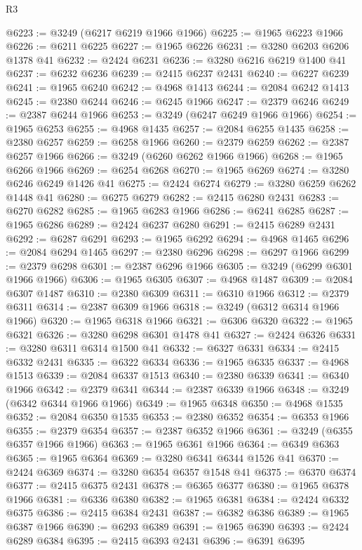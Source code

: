 \begin{lexlean}{R3}
\begin{coremodule}
@6223 := @3249 (@6217 @6219 @1966 @1966)
@6225 := @1965 @6223 @1966
@6226 := @6211 @6225
@6227 := @1965 @6226
@6231 := @3280 @6203 @6206 @1378 @41
@6232 := @2424 @6231
@6236 := @3280 @6216 @6219 @1400 @41
@6237 := @6232 @6236
@6239 := @2415 @6237 @2431
@6240 := @6227 @6239
@6241 := @1965 @6240
@6242 := @4968 @1413
@6244 := @2084 @6242 @1413
@6245 := @2380 @6244
@6246 := @6245 @1966
@6247 := @2379 @6246
@6249 := @2387 @6244 @1966
@6253 := @3249 (@6247 @6249 @1966 @1966)
@6254 := @1965 @6253
@6255 := @4968 @1435
@6257 := @2084 @6255 @1435
@6258 := @2380 @6257
@6259 := @6258 @1966
@6260 := @2379 @6259
@6262 := @2387 @6257 @1966
@6266 := @3249 (@6260 @6262 @1966 @1966)
@6268 := @1965 @6266 @1966
@6269 := @6254 @6268
@6270 := @1965 @6269
@6274 := @3280 @6246 @6249 @1426 @41
@6275 := @2424 @6274
@6279 := @3280 @6259 @6262 @1448 @41
@6280 := @6275 @6279
@6282 := @2415 @6280 @2431
@6283 := @6270 @6282
@6285 := @1965 @6283 @1966
@6286 := @6241 @6285
@6287 := @1965 @6286
@6289 := @2424 @6237 @6280
@6291 := @2415 @6289 @2431
@6292 := @6287 @6291
@6293 := @1965 @6292
@6294 := @4968 @1465
@6296 := @2084 @6294 @1465
@6297 := @2380 @6296
@6298 := @6297 @1966
@6299 := @2379 @6298
@6301 := @2387 @6296 @1966
@6305 := @3249 (@6299 @6301 @1966 @1966)
@6306 := @1965 @6305
@6307 := @4968 @1487
@6309 := @2084 @6307 @1487
@6310 := @2380 @6309
@6311 := @6310 @1966
@6312 := @2379 @6311
@6314 := @2387 @6309 @1966
@6318 := @3249 (@6312 @6314 @1966 @1966)
@6320 := @1965 @6318 @1966
@6321 := @6306 @6320
@6322 := @1965 @6321
@6326 := @3280 @6298 @6301 @1478 @41
@6327 := @2424 @6326
@6331 := @3280 @6311 @6314 @1500 @41
@6332 := @6327 @6331
@6334 := @2415 @6332 @2431
@6335 := @6322 @6334
@6336 := @1965 @6335
@6337 := @4968 @1513
@6339 := @2084 @6337 @1513
@6340 := @2380 @6339
@6341 := @6340 @1966
@6342 := @2379 @6341
@6344 := @2387 @6339 @1966
@6348 := @3249 (@6342 @6344 @1966 @1966)
@6349 := @1965 @6348
@6350 := @4968 @1535
@6352 := @2084 @6350 @1535
@6353 := @2380 @6352
@6354 := @6353 @1966
@6355 := @2379 @6354
@6357 := @2387 @6352 @1966
@6361 := @3249 (@6355 @6357 @1966 @1966)
@6363 := @1965 @6361 @1966
@6364 := @6349 @6363
@6365 := @1965 @6364
@6369 := @3280 @6341 @6344 @1526 @41
@6370 := @2424 @6369
@6374 := @3280 @6354 @6357 @1548 @41
@6375 := @6370 @6374
@6377 := @2415 @6375 @2431
@6378 := @6365 @6377
@6380 := @1965 @6378 @1966
@6381 := @6336 @6380
@6382 := @1965 @6381
@6384 := @2424 @6332 @6375
@6386 := @2415 @6384 @2431
@6387 := @6382 @6386
@6389 := @1965 @6387 @1966
@6390 := @6293 @6389
@6391 := @1965 @6390
@6393 := @2424 @6289 @6384
@6395 := @2415 @6393 @2431
@6396 := @6391 @6395

\end{coremodule}
\end{lexlean}
